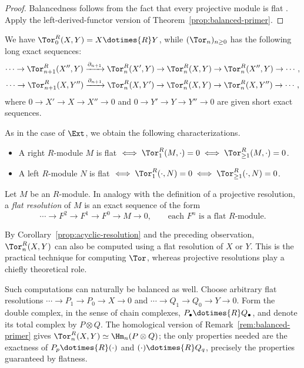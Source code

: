 \begin{proof}
Balancedness follows from the fact that every projective module is flat
\cite[Corollary 6.9.9]{Li1}. Apply the left-derived-functor version of
Theorem~\ref{prop:balanced-primer}.
\end{proof}

We have $\Tor^R_0(X,Y)=X\dotimes{R}Y$, while $(\Tor_n)_{n\geq0}$ has the
following long exact sequences:
\begin{gather*}
\cdots\to\Tor^R_{n+1}(X'',Y)\xrightarrow{\partial_{n+1}}\Tor^R_n(X',Y)\to
\Tor^R_n(X,Y)\to\Tor^R_n(X'',Y)\to\cdots,\\
\cdots\to\Tor^R_{n+1}(X,Y'')\xrightarrow{\partial_{n+1}}\Tor^R_n(X,Y')\to
\Tor^R_n(X,Y)\to\Tor^R_n(X,Y'')\to\cdots,
\end{gather*}
where $0\to X'\to X\to X''\to0$ and
$0\to Y'\to Y\to Y''\to0$ are given short exact sequences.

As in the case of $\Ext$, we obtain the following characterizations.

\begin{itemize}
\item A right $R$-module $M$ is flat $\iff \Tor^R_1(M,\cdot)=0\iff
\Tor^R_{\geq1}(M,\cdot)=0$.
\item A left $R$-module $N$ is flat $\iff \Tor^R_1(\cdot,N)=0\iff
\Tor^R_{\geq1}(\cdot,N)=0$.
\end{itemize}

Let $M$ be an $R$-module. In analogy with the definition of a projective
resolution, a \emph{flat resolution} of $M$ is an
exact sequence of the form
\[
\cdots\to F^2\to F^1\to F^0\to M\to0,\qquad
\text{each $F^n$ is a flat $R$-module}.
\]

By Corollary~\ref{prop:acyclic-resolution} and the preceding observation,
$\Tor^R_n(X,Y)$ can also be computed using a flat resolution of $X$ or $Y$.
This is the practical technique for computing $\Tor$, whereas projective
resolutions play a chiefly theoretical role.

Such computations can naturally be balanced as well. Choose arbitrary flat
resolutions $\cdots\to P_1\to P_0\to X\to0$ and
$\cdots\to Q_1\to Q_0\to Y\to0$. Form the double complex, in the sense of
chain complexes, $P_\bullet\dotimes{R}Q_\bullet$, and denote its total
complex by $P\otimes Q$. The homological version of
Remark~\ref{rem:balanced-primer} gives
$\Tor_n^R(X,Y)\simeq\Hm_n(P\otimes Q)$; the only properties needed are the
exactness of $P_p\dotimes{R}(\cdot)$ and
$(\cdot)\dotimes{R}Q_q$, precisely the properties guaranteed by flatness.


